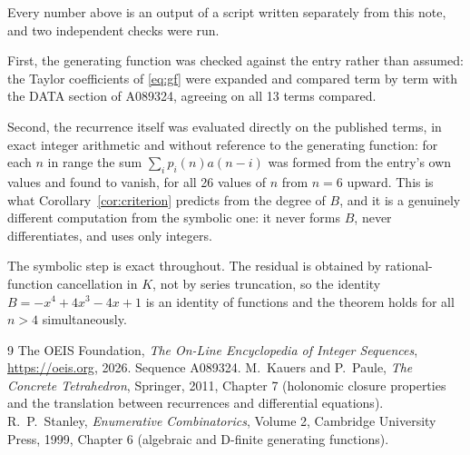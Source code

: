 \documentclass[11pt,a4paper]{article}
\theoremstyle{plain}
\theoremstyle{definition}
\begin{document}
Every number above is an output of a script written separately from this note, and two
independent checks were run.

First, the generating function was checked against the entry rather than assumed: the
Taylor coefficients of \eqref{eq:gf} were expanded and compared term by term with the DATA
section of A089324, agreeing on all 13 terms compared.

Second, the recurrence itself was evaluated directly on the published terms, in exact
integer arithmetic and without reference to the generating function: for each $n$ in range
the sum $\sum_{i}p_{i}(n)a(n-i)$ was formed from the entry's own values and found to
vanish, for all 26 values of $n$ from $n=6$ upward. This is what
Corollary~\ref{cor:criterion} predicts from the degree of $B$, and it is a genuinely
different computation from the symbolic one: it never forms $B$, never differentiates, and
uses only integers.

The symbolic step is exact throughout. The residual is obtained by rational-function
cancellation in $K$, not by series truncation, so the identity $B=- x^{4} + 4 x^{3} - 4 x + 1$ is an
identity of functions and the theorem holds for all $n>4$ simultaneously.

\begin{thebibliography}{9}
 The OEIS Foundation, \emph{The On-Line Encyclopedia of Integer Sequences},
\url{https://oeis.org}, 2026. Sequence A089324.
 M.~Kauers and P.~Paule, \emph{The Concrete Tetrahedron}, Springer, 2011,
Chapter 7 (holonomic closure properties and the translation between recurrences and
differential equations).
 R.~P.~Stanley, \emph{Enumerative Combinatorics}, Volume 2, Cambridge
University Press, 1999, Chapter 6 (algebraic and D-finite generating functions).
\end{thebibliography}
\end{document}
